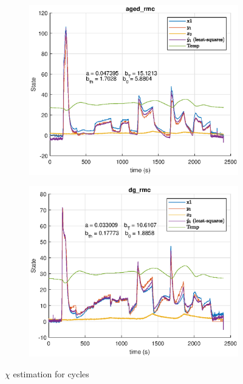 \begin{figure}[H]
    \begin{minipage}{0.49\textwidth}
        \begin{figure}[H]
            \includegraphics[width=\textwidth]{./figs/chi_est/aged_rmc_chiT.eps}
        \end{figure}
    \end{minipage}
    \begin{minipage}{0.49\textwidth}
        \begin{figure}[H]
            \includegraphics[width=\textwidth]{./figs/chi_est/dg_rmc_chiT.eps}
        \end{figure}
    \end{minipage}
        \caption{$\chi$ estimation for  cycles}
\end{figure}

